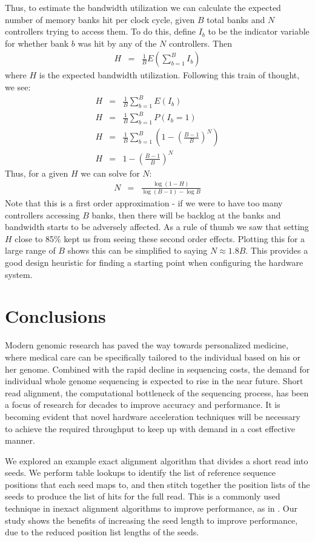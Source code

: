 \documentclass[11pt]{article}
\begin{document}
Thus, to estimate the bandwidth utilization we can calculate the expected number of memory banks hit per clock cycle, given $B$ total banks and $N$ controllers trying to access them. To do this, define $I_b$ to be the indicator variable for whether bank $b$ was hit by any of the $N$ controllers. Then
\begin{eqnarray*}
H&=&\frac{1}{B}E(\sum_{b=1}^{B} I_b)
\end{eqnarray*}
where $H$ is the expected bandwidth utilization. Following this train of thought, we see:
\begin{eqnarray*}
H&=&\frac{1}{B} \sum_{b=1}^{B} E(I_b) \\
H&=&\frac{1}{B} \sum_{b=1}^{B} P(I_b = 1) \\
H&=&\frac{1}{B} \sum_{b=1}^{B} (1-(\frac{B-1}{B})^N) \\
H&=& 1-(\frac{B-1}{B})^N
\end{eqnarray*}
Thus, for a given $H$ we can solve for $N$:
\begin{eqnarray*}
N&=&\frac{\log{(1-H)}}{\log{(B-1)}-\log{B}}
\end{eqnarray*}
Note that this is a first order approximation - if we were to have too many controllers accessing $B$ banks, then there will be backlog at the banks and bandwidth starts to be adversely affected. As a rule of thumb we saw that setting $H$ close to 85\% kept us from seeing these second order effects. Plotting this for a large range of $B$ shows this can be simplified to saying $N \approx 1.8B$. This provides a good design heuristic for finding a starting point when configuring the hardware system.

\section{Conclusions}

Modern genomic research has paved the way towards personalized medicine, where medical care can be specifically tailored to the individual based on his or her genome.  Combined with the rapid decline in sequencing costs, the demand for individual whole genome sequencing is expected to rise in the near future.  Short read alignment, the computational bottleneck of the sequencing process, has been a focus of research for decades to improve accuracy and performance.  It is becoming evident that novel hardware acceleration techniques will be necessary to achieve the required throughput to keep up with demand in a cost effective manner.


	We explored an example exact alignment algorithm that divides a short read into seeds. We perform table lookups to identify the list of reference sequence positions that each seed maps to, and then stitch together the position lists of the seeds to produce the list of hits for the full read.  This is a commonly used technique in inexact alignment algorithms to improve performance, as in \cite{ning2001ssaha, toh2009basic, zaharia2011faster}.  Our study shows the benefits of increasing the seed length to improve performance, due to the reduced position list lengths of the seeds.
\end{document}
